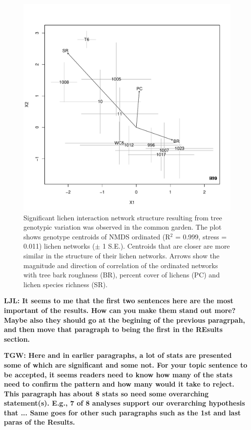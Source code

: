 \documentclass[9pt,twocolumn,twoside,lineno]{pnas-new}
\begin{document}
{\begin{figure}[ht]
\centering
\includegraphics[width=\linewidth]{cn_chplot.pdf}
\caption{Significant lichen interaction network structure resulting
  from tree genotypic variation was observed in the common garden.
  The plot shows genotype centroids of NMDS ordinated (R$^2$ = 0.999,
  stress = 0.011) lichen networks ($\pm$ 1 S.E.). Centroids that are
  closer are more similar in the structure of their lichen
  networks. Arrows show the magnitude and direction of correlation of
  the ordinated networks with tree bark roughness (BR), percent cover
  of lichens (PC) and lichen species richness (SR).}
\label{fig:cn_ch_plot}
\end{figure}


\textbf{LJL: It seems to me that the first two sentences here are the
  most important of the results. How can you make them stand out more?
  Maybe also they should go at the begining of the previous paragrpah,
  and then move that paragraph to being the first in the REsults
  section.}

\textbf{TGW: Here and in earlier paragraphs, a lot of stats are
  presented some of which are significant and some not.  For your
  topic sentence to be accepted, it seems readers need to know how
  many of the stats need to confirm the pattern and how many would it
  take to reject.  This paragraph has about 8 stats so need some
  overarching statement(s).  E.g., 7 of 8 analyses support our
  overarching hypothesis that ...  Same goes for other such paragraphs
  such as the 1st and last paras of the Results.}

}
\end{document}
